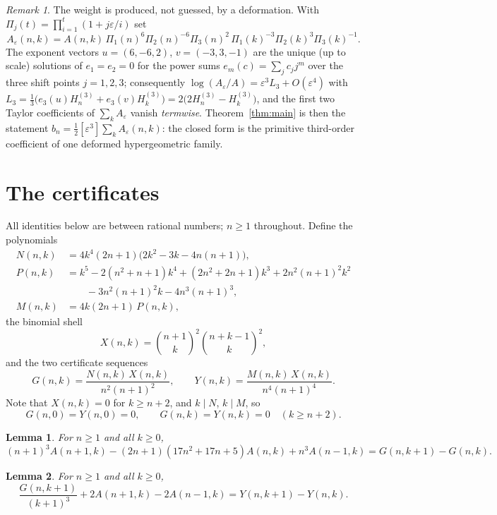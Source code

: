 \documentclass[11pt]{article}
\newtheorem{lemma}{Lemma}
\theoremstyle{remark}
\newtheorem{remark}{Remark}
\begin{document}
\begin{remark}\label{rem:origin}
The weight is produced, not guessed, by a deformation. With
$\Pi_j(t)=\prod_{i=1}^{t}(1+j\varepsilon/i)$ set
\[
A_\varepsilon(n,k)
= A(n,k)\,\Pi_1(n)^{6}\Pi_2(n)^{-6}\Pi_3(n)^{2}\,
          \Pi_1(k)^{-3}\Pi_2(k)^{3}\Pi_3(k)^{-1}.
\]
The exponent vectors $u=(6,-6,2)$, $v=(-3,3,-1)$ are the unique (up to scale)
solutions of $e_1=e_2=0$ for the power sums $e_m(c)=\sum_j c_j j^m$ over the
three shift points $j=1,2,3$; consequently
$\log(A_\varepsilon/A)=\varepsilon^{3}L_3+O(\varepsilon^{4})$ with
$L_3=\tfrac13\bigl(e_3(u)H^{(3)}_n+e_3(v)H^{(3)}_k\bigr)
    =2\bigl(2H^{(3)}_n-H^{(3)}_k\bigr)$,
and the first two Taylor coefficients of $\sum_kA_\varepsilon$ vanish
\emph{termwise}. Theorem~\ref{thm:main} is then the statement
$b_n=\tfrac12[\varepsilon^{3}]\sum_kA_\varepsilon(n,k)$: the closed form is
the primitive third-order coefficient of one deformed hypergeometric family.
\end{remark}

\section{The certificates}

All identities below are between rational numbers; $n\ge1$ throughout.
Define the polynomials
\begin{align*}
N(n,k)&=4k^{4}(2n+1)\bigl(2k^{2}-3k-4n(n+1)\bigr),\\
P(n,k)&=k^{5}-2(n^{2}+n+1)k^{4}+(2n^{2}+2n+1)k^{3}
        +2n^{2}(n+1)^{2}k^{2}\\
      &\qquad-3n^{2}(n+1)^{2}k-4n^{3}(n+1)^{3},\\
M(n,k)&=4k(2n+1)\,P(n,k),
\end{align*}
the binomial shell
\[
X(n,k)=\binom{n+1}{k}^{2}\binom{n+k-1}{k}^{2},
\]
and the two certificate sequences
\[
G(n,k)=\frac{N(n,k)\,X(n,k)}{n^{2}(n+1)^{2}},\qquad
Y(n,k)=\frac{M(n,k)\,X(n,k)}{n^{4}(n+1)^{4}} .
\]
Note that $X(n,k)=0$ for $k\ge n+2$, and $k\mid N$, $k\mid M$, so
\begin{equation}\label{eq:bdry}
G(n,0)=Y(n,0)=0,\qquad G(n,k)=Y(n,k)=0\quad(k\ge n+2).
\end{equation}

\begin{lemma}\label{lem:P1}
For $n\ge1$ and all $k\ge0$,
\[
(n+1)^{3}A(n+1,k)-(2n+1)(17n^{2}+17n+5)A(n,k)+n^{3}A(n-1,k)
= G(n,k+1)-G(n,k).
\]
\end{lemma}

\begin{lemma}\label{lem:P2}
For $n\ge1$ and all $k\ge0$,
\[
\frac{G(n,k+1)}{(k+1)^{3}}+2A(n+1,k)-2A(n-1,k)
= Y(n,k+1)-Y(n,k).
\]
\end{lemma}
\end{document}
